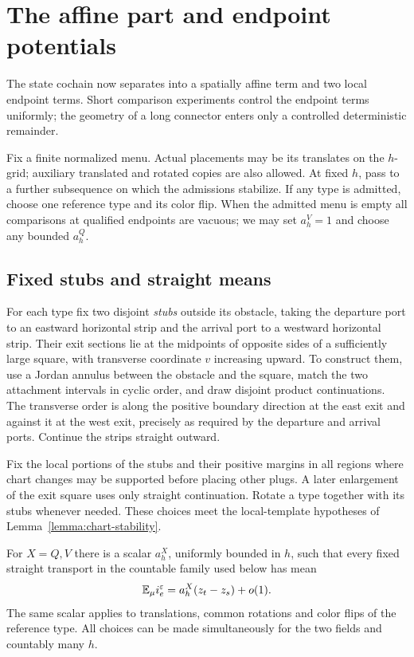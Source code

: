 \section{The affine part and endpoint potentials}\label{sec:affine}

The state cochain now separates into a spatially affine term and two
local endpoint terms. Short comparison experiments control the endpoint
terms uniformly; the geometry of a long connector enters only a
controlled deterministic remainder.

Fix a finite normalized menu.  Actual placements may be its translates
on the $h$-grid; auxiliary translated and rotated copies are also allowed.
At fixed $h$, pass to a further subsequence on which the admissions
stabilize.  If any type is admitted, choose one reference type and its
color flip.  When the admitted menu is empty all comparisons at qualified
endpoints are vacuous; we may set $a_h^V=1$ and choose any bounded $a_h^Q$.

\subsection{Fixed stubs and straight means}

For each type fix two disjoint \emph{stubs} outside its obstacle, taking
the departure port to an eastward horizontal strip and the arrival port
to a westward horizontal strip.  Their exit sections lie at the midpoints
of opposite sides of a sufficiently large square, with transverse
coordinate $v$ increasing upward.  To construct them, use a Jordan
annulus between the obstacle and the square, match the two attachment
intervals in cyclic order, and draw disjoint product continuations.
The transverse order is along the positive boundary direction at the
east exit and against it at the west exit, precisely as required by the
departure and arrival ports.  Continue the strips straight outward.

Fix the local portions of the stubs and their positive margins in all
regions where chart changes may be supported before placing other
plugs.  A later enlargement of the exit square uses only straight
continuation.  Rotate a type together with its stubs whenever needed.
These choices meet the local-template hypotheses of
Lemma~\ref{lemma:chart-stability}.

\begin{proposition}\label{prop:affine}
For $X=Q,V$ there is a scalar $a_h^X$, uniformly bounded in $h$, such
that every fixed straight transport in the countable family used below
has mean
\begin{equation}\label{affine:means}
 \mathbb E_\mu i_e^\varepsilon=a_h^X(z_t-z_s)+o(1).
\end{equation}
The same scalar applies to translations, common rotations and color
flips of the reference type.  All choices can be made simultaneously
for the two fields and countably many $h$.
\end{proposition}

